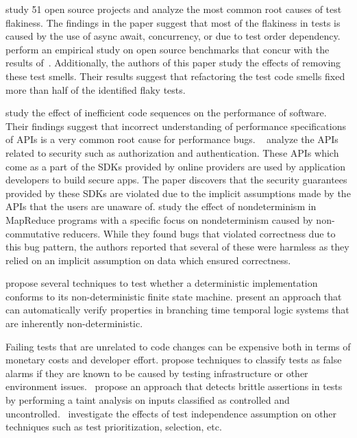\cite{LuoHEM2014} study 51 open source projects and analyze the most common root causes of
test flakiness. The findings in the paper suggest that most of the flakiness in tests is caused by
the use of async await, concurrency, or due to test order dependency.~\cite{Plotkin:1993:LPP:645891.671433}
perform an empirical study on open source benchmarks that concur with the results of~\cite{LuoHEM2014}.
Additionally, the authors of this paper study the effects of removing these test smells. Their results suggest that
refactoring the test code smells fixed more than half of the identified flaky tests.

\cite{Jin:2012:UDR:2254064.2254075} study the effect of inefficient code sequences on the performance of software.
Their findings suggest that incorrect understanding of performance specifications of APIs is a very common root cause for
performance bugs. ~\cite{Rui:2013:180377} analyze the APIs related to security such as authorization and authentication.
These APIs which come as a part of the SDKs provided by online providers are used by application developers to 
build secure apps. The paper discovers that the security guarantees provided by these SDKs are violated due to
the implicit assumptions made by the APIs that the users are unaware of. \cite{Xiao:2014:NMC:2591062.2591177}
study the effect of nondeterminism in MapReduce programs with a specific focus on nondeterminism caused by
non-commutative reducers. While they found bugs that violated correctness due to this bug pattern,
the authors reported that several of these were harmless as they relied on an implicit assumption on data
which ensured correctness. 

\cite{Petrenko1996,Petrenko:1993:NSM:648128.761244,Savor:1997:639710,Hierons:2004:TCD:1040993.1040998} propose several techniques to test whether a
deterministic implementation conforms to its non-deterministic finite state machine.
\cite{Cook:2013:RNP:2491956.2491969} present an approach that can automatically verify properties
in branching time temporal logic systems that are inherently non-deterministic.

Failing tests that are unrelated to code changes can be expensive both in terms of monetary costs and
developer effort. \cite{Herzig:2015:EDF:2819009.2819018} propose techniques to classify tests as false alarms
if they are known to be caused by testing infrastructure or other environment issues.~\cite{Huo:2014:IOQ:2635868.2635917}
propose an approach that detects brittle assertions in tests by performing a taint analysis on inputs classified as 
controlled and uncontrolled.~\cite{ZhangJWMLEN2014} investigate the effects of test independence assumption
on other techniques such as test prioritization, selection, etc. 
\cite{BellKMD2015}
\cite{Gyori:2015:RTD:2771783.2771793}
\cite{Dan:2013:10.1007/978-3-642-39038-8_25}
\cite{Vahabzadeh:2015:7332456}
\cite{Fowler}
\cite{Sudarshan}



